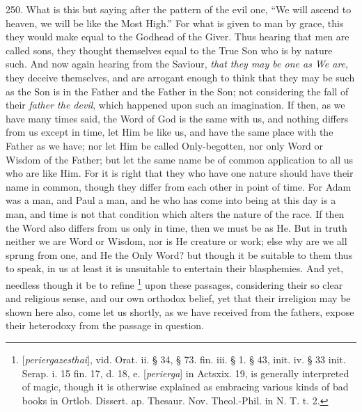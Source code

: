 250. What is
this but saying after the pattern of the evil one, ``We will ascend to
heaven, we will be like the Most High.'' For what is given to man by
grace, this they would make equal to the Godhead of the Giver. Thus
hearing that men are called sons, they thought themselves equal to the
True Son who is by nature such. And now again hearing from the Saviour,
\emph{that they may be one as We are}, they deceive themselves, and
are arrogant enough to think that they may be such as the Son is in
the Father and the Father in the Son; not considering the fall of
their \emph{father the devil}, which happened upon such an
imagination. If then, as we have many times said, the Word of God is
the same with us, and nothing differs from us except in time, let Him
be like us, and have the same place with the Father as we have; nor
let Him be called Only-begotten, nor only Word or Wisdom of the
Father; but let the same name be of common application to all us
who are like Him. For it is right that they who have one nature should
have their name in common, though they differ from each other in point
of time. For Adam was a man, and Paul a man, and he who has come into
being at this day is a man, and time is not that condition which
alters the nature of the race. If then the Word also differs from us
only in time, then we must be as He. But in truth neither we are Word
or Wisdom, nor is He creature or work; else why are we all sprung from
one, and He the Only Word? but though it be suitable to them thus to
speak, in us at least it is unsuitable to entertain their blasphemies.
And yet, needless though it be to refine \footnote{[\emph{periergazesthai}], vid. Orat. ii. § 34, § 73. fin. iii. § 1.
§ 43, init. iv. § 33 init. Serap. i. 15 fin. 17, d. 18, e. [\emph{perierga}]
in Acts\emph{}xix. 19, is generally interpreted of magic, though it
is otherwise explained as embracing various kinds of bad books in
Ortlob. Dissert. ap. Thesaur. Nov. Theol.-Phil. in N. T. t. 2.} upon these passages, considering their so clear and religious
sense, and our own orthodox belief, yet that their irreligion may be
shown here also, come let us shortly, as we have received from the
fathers, expose their heterodoxy from the passage in question.

